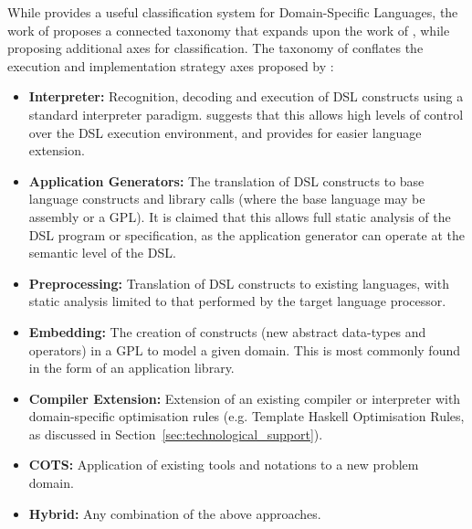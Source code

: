 \documentclass[a4paper,11pt]{report}
\begin{document}
While \citet{van2000domain} provides a useful classification system for Domain-Specific Languages, the work of \citet{Mernik:2005:DDL:1118890.1118892} proposes a connected taxonomy that expands upon the work of \citet{van2000domain}, while proposing additional axes for classification.
The taxonomy of \citet{Mernik:2005:DDL:1118890.1118892} conflates the execution and implementation strategy axes proposed by \citet{van2000domain}:
\begin{itemize}
    \item \textbf{Interpreter:} Recognition, decoding and execution of DSL constructs using a standard interpreter paradigm.
    \citet{Mernik:2005:DDL:1118890.1118892} suggests that this allows high levels of control over the DSL execution environment, and provides for easier language extension.
    \item \textbf{Application Generators:} The translation of DSL constructs to base language constructs and library calls (where the base language may be assembly or a GPL). 
    It is claimed that this allows full static analysis of the DSL program or specification, as the application generator can operate at the semantic level of the DSL.
    \item \textbf{Preprocessing:} Translation of DSL constructs to existing languages, with static analysis limited to that performed by the target language processor.
    \item \textbf{Embedding:} The creation of constructs (new abstract data-types and operators) in a GPL to model a given domain.
    This is most commonly found in the form of an application library. 
    \item \textbf{Compiler Extension:} Extension of an existing compiler or interpreter with domain-specific optimisation rules (e.g. Template Haskell Optimisation Rules, as discussed in Section~\ref{sec:technological_support}).
    \item \textbf{COTS:} Application of existing tools and notations to a new problem domain. 
    \item \textbf{Hybrid:} Any combination of the above approaches. 
\end{itemize}
\end{document}
